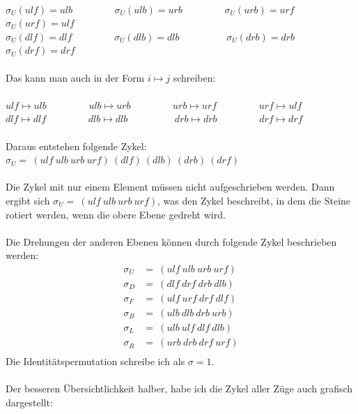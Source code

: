 \documentclass[12pt,a4paper, usenames, dvipsnames]{article}
\begin{document}
\ \\
$\sigma_U(ulf)=ulb$ \ \ \ \ \ \ \ \ $\sigma_U(ulb)=urb$ \ \ \ \ \ \ \ \ $\sigma_U(urb)=urf$ \ \ \ \ \ \ \ \ $\sigma_U(urf)=ulf$ \\
$\sigma_U(dlf)=dlf$ \ \ \ \ \ \ \ \ $\sigma_U(dlb)=dlb$ \ \ \ \ \ \ \ \ \ $\sigma_U(drb)=drb$ \ \ \ \ \ \ \ \ $\sigma_U(drf)=drf$ \\
\\
Das kann man auch in der Form $i \mapsto j$ schreiben: \\
\\
$ulf \mapsto ulb$ \ \ \ \ \ \ \ \ $ulb \mapsto urb$ \ \ \ \ \ \ \ \ $urb \mapsto urf$ \ \ \ \ \ \ \ \ $urf \mapsto ulf$ \\
$dlf \mapsto dlf$ \ \ \ \ \ \ \ \ $dlb \mapsto dlb$ \ \ \ \ \ \ \ \ \ $drb \mapsto drb$ \ \ \ \ \ \ \ \ $drf \mapsto drf$ \\
\\
Daraus entstehen folgende Zykel: $\sigma_U = \ (ulf \ ulb \ urb \ urf)\ (dlf)\ (dlb)\ (drb)\ (drf)$ \\ \\
Die Zykel mit nur einem Element müssen nicht aufgeschrieben werden. Dann ergibt sich $\sigma_U = \ (ulf \ ulb \ urb \ urf)$, was den Zykel beschreibt, in dem die Steine rotiert werden, wenn die obere Ebene gedreht wird. \\
\\
Die Drehungen der anderen Ebenen können durch folgende Zykel beschrieben werden: \\
\begin{align*}
\sigma_U & =\ (ulf \ ulb \ urb \ urf) \\
\sigma_D & =\ (dlf \ drf \ drb \ dlb) \\
\sigma_F & =\ (ulf \ urf \ drf \ dlf) \\
\sigma_B & =\ (ulb \ dlb \ drb \ urb) \\
\sigma_L & =\ (ulb \ ulf \ dlf \ dlb) \\
\sigma_R & =\ (urb \ drb \ drf \ urf) \\
\end{align*}
Die Identitätspermutation schreibe ich als $\sigma = 1$.
\\
\\
Der besseren Übersichtlichkeit halber, habe ich die Zykel aller Züge auch grafisch dargestellt: \\
\end{document}
